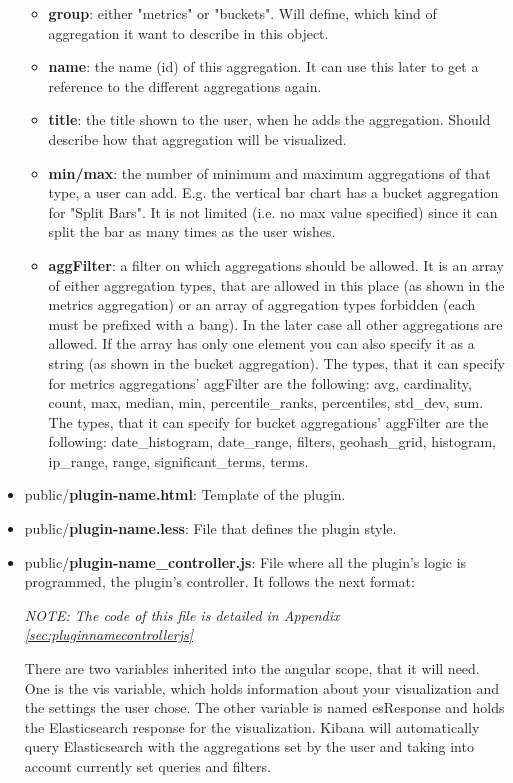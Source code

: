 \documentclass[a4paper, 12pt]{book}
\begin{document}
\begin{itemize}
\begin{itemize}
\item \textbf{group}: either "metrics" or "buckets". Will define, which kind of aggregation it want to describe in this object.
\item \textbf{name}: the name (id) of this aggregation. It can use this later to get a reference to the different aggregations again.
\item \textbf{title}: the title shown to the user, when he adds the aggregation. Should describe how that aggregation will be visualized.
\item \textbf{min/max}: the number of minimum and maximum aggregations of that type, a user can add. E.g. the vertical bar chart has a bucket aggregation for "Split Bars". It is not limited (i.e. no max value specified) since it can split the bar as many times as the user wishes.
\item \textbf{aggFilter}: a filter on which aggregations should be allowed. It is an array of either aggregation types, that are allowed in this place (as shown in the metrics aggregation) or an array of aggregation types forbidden (each must be prefixed with a bang). In the later case all other aggregations are allowed. If the array has only one element you can also specify it as a string (as shown in the bucket aggregation). The types, that it can specify for metrics aggregations' aggFilter are the following: avg, cardinality, count, max, median, min, percentile\_ranks, percentiles, std\_dev, sum. The types, that it can specify for bucket aggregations' aggFilter are the following: date\_histogram, date\_range, filters, geohash\_grid, histogram, ip\_range, range, significant\_terms, terms.
\end{itemize}


\item public/\textbf{plugin-name.html}: Template of the plugin.
\item public/\textbf{plugin-name.less}: File that defines the plugin style.
\item public/\textbf{plugin-name\_controller.js}: File where all the plugin’s logic is programmed, the plugin’s controller. It follows the next format:

\begin{center}
\textit{NOTE: The code of this file is detailed in Appendix \ref{sec:pluginnamecontrollerjs}}
\end{center}

There are two variables inherited into the angular scope, that it will need. One is the vis variable, which holds information about your visualization and the settings the user chose. The other variable is named esResponse and holds the Elasticsearch response for the visualization. Kibana will automatically query Elasticsearch with the aggregations set by the user and taking into account currently set queries and filters.


\end{itemize}
\end{document}
